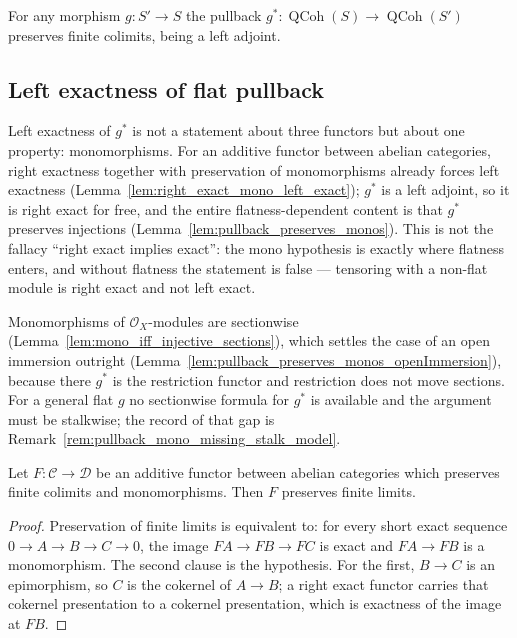 \begin{lemma}\leanok
  \label{lem:pullback_preserves_finite_colimits}
  For any morphism \(g : S' \to S\) the pullback \(g^* : \operatorname{QCoh}(S) \to
  \operatorname{QCoh}(S')\) preserves finite colimits, being a left adjoint.
\end{lemma}

\subsection{Left exactness of flat pullback}
\label{sec:pullback_pfl_decomposition}

Left exactness of \(g^*\) is not a statement about three functors but about one property:
monomorphisms. For an additive functor between abelian categories, right exactness together
with preservation of monomorphisms already forces left exactness
(Lemma~\ref{lem:right_exact_mono_left_exact}); \(g^*\) is a left adjoint, so it is right exact
for free, and the entire flatness-dependent content is that \(g^*\) preserves injections
(Lemma~\ref{lem:pullback_preserves_monos}). This is not the fallacy ``right exact implies
exact'': the mono hypothesis is exactly where flatness enters, and without flatness the
statement is false --- tensoring with a non-flat module is right exact and not left exact.

Monomorphisms of \(\mathcal{O}_X\)-modules are sectionwise
(Lemma~\ref{lem:mono_iff_injective_sections}), which settles the case of an open immersion
outright (Lemma~\ref{lem:pullback_preserves_monos_openImmersion}), because there \(g^*\) is the
restriction functor and restriction does not move sections. For a general flat \(g\) no
sectionwise formula for \(g^*\) is available and the argument must be stalkwise; the record of
that gap is Remark~\ref{rem:pullback_mono_missing_stalk_model}.

\begin{lemma}\leanok
  \label{lem:right_exact_mono_left_exact}
  Let \(F : \mathcal{C} \to \mathcal{D}\) be an additive functor between abelian categories
  which preserves finite colimits and monomorphisms. Then \(F\) preserves finite limits.
\end{lemma}

\begin{proof}\leanok
  Preservation of finite limits is equivalent to: for every short exact sequence
  \(0 \to A \to B \to C \to 0\), the image \(F A \to F B \to F C\) is exact and \(F A \to F B\)
  is a monomorphism. The second clause is the hypothesis. For the first, \(B \to C\) is an
  epimorphism, so \(C\) is the cokernel of \(A \to B\); a right exact functor carries that
  cokernel presentation to a cokernel presentation, which is exactness of the image at \(F B\).
\end{proof}


